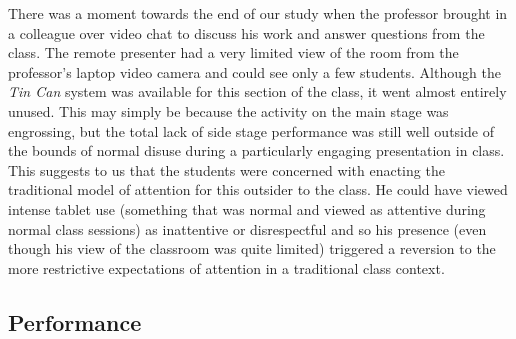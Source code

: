 
There was a moment towards the end of our study when the professor brought in a colleague over video chat to discuss his work and answer questions from the class. The remote presenter had a very limited view of the room from the professor's laptop video camera and could see only a few students. Although the \emph{Tin Can} system was available for this section of the class, it went almost entirely unused. This may simply be because the activity on the main stage was engrossing, but the total lack of side stage performance was still well outside of the bounds of normal disuse during a particularly engaging presentation in class. This suggests to us that the students were concerned with enacting the traditional model of attention for this outsider to the class. He could have viewed intense tablet use (something that was normal and viewed as attentive during normal class sessions) as inattentive or disrespectful and so his presence (even though his view of the classroom was quite limited) triggered a reversion to the more restrictive expectations of attention in a traditional class context.


\subsection{Performance}

